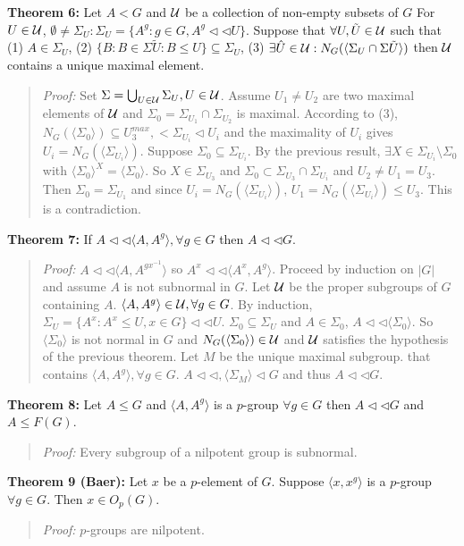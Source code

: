 {\bf Theorem 6:}
Let $A < G$ and ${\cal U}$ be a collection of non-empty subsets of $G$
For $U \in {\cal U}$, $\emptyset \ne \Sigma_U:
\Sigma_U = \{ A^g : g \in G, A^g \lhd \lhd U \}$.  Suppose that $\forall U, \tilde{U} \in {\cal U}$
such that (1) $A \in \Sigma_U$, (2) $\{ B: B \in \Sigma{\tilde{U}} : B \le U \} \subseteq \Sigma_U$,
(3) $\exists \hat{U} \in {\cal U}: N_G( \langle \Sigma_U \cap \Sigma{\tilde{U}} \rangle)$
then ${\cal U}$ contains a unique maximal element.
\begin{quote}
\emph{Proof:}
Set $\Sigma= \bigcup_{U \in {\cal U}} \Sigma_U, U \in {\cal U}$.  Assume $U_1 \ne U_2$
are two maximal elements of ${\cal U}$ and $\Sigma_0 = \Sigma_{U_1} \cap \Sigma_{U_2}$
is maximal.  According to (3), $N_G( \langle \Sigma_0 \rangle) \subseteq U_3^{max}, <\Sigma_{U_i} \lhd U_i$
and the maximality of $U_i$ gives $U_i= N_G( \langle \Sigma_{U_i} \rangle)$.
Suppose $\Sigma_0 \subseteq \Sigma_{U_i}$.  By the previous result, $\exists X \in \Sigma_{U_i} \setminus \Sigma_0$ with $ \langle \Sigma_0 \rangle^X = \langle \Sigma_0 \rangle $.  So
$X \in \Sigma_{U_3}$ and $\Sigma_0 \subset \Sigma_{U_3} \cap \Sigma_{U_i}$ and
$U_2 \ne U_1 = U_3$.  Then $\Sigma_0 = \Sigma_{U_1}$ and since
$U_i= N_G( \langle \Sigma_{U_i} \rangle)$,
$U_1= N_G( \langle \Sigma_{U_i} \rangle) \le U_3$.  This is a contradiction.
\end{quote}
{\bf Theorem 7:}
If $A \lhd \lhd \langle A,A^g \rangle , \forall g \in G$ then $A \lhd \lhd G$.
\begin{quote}
\emph{Proof:}
$A \lhd \lhd \langle A , A^{gx^{-1}} \rangle $ so
$A^x \lhd \lhd \langle A^x , A^{g} \rangle $.  Proceed by induction on $|G|$ and assume $A$ is not
subnormal in $G$.  Let ${\cal U}$ be the proper subgroups of $G$ containing $A$.
$ \langle A, A^g \rangle \in {\cal U}, \forall g \in G$.  By induction,
$\Sigma_U= \{ A^x: A^x \le U, x \in G \} \lhd \lhd U$.  $\Sigma_0 \subseteq \Sigma_U$
and $A \in \Sigma_0$, $A \lhd \lhd \langle \Sigma_0 \rangle $.  So
$ \langle \Sigma_0 \rangle $ is not normal in $G$ and $N_G( \langle \Sigma_0 \rangle) \in {\cal U}$ and ${\cal U}$
satisfies the hypothesis of the previous theorem.  Let $M$ be the unique maximal subgroup.
that contains $ \langle A, A^g \rangle , \forall g \in G$.  $A \lhd \lhd , \langle \Sigma_M \rangle \lhd G$ and
thus $A \lhd \lhd G$.
\end{quote}
{\bf Theorem 8:} Let $A \leq G$ and $\langle A, A^g \rangle$ is a $p$-group $\forall g \in G$ then $A \lhd \lhd G$ and $A \leq F(G)$.
\begin{quote}
\emph{Proof:}
Every subgroup of a nilpotent group is subnormal.
\end{quote}
{\bf Theorem 9 (Baer):} Let $x$ be a $p$-element of $G$.  Suppose $\langle x, x^g \rangle$ is a $p$-group $\forall g \in G$.
Then $x \in O_p(G)$.
\begin{quote}
\emph{Proof:}
$p$-groups are nilpotent.
\end{quote}
